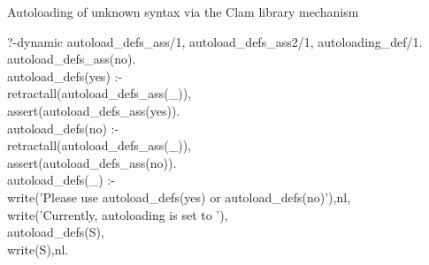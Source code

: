 \documentclass[11pt]{report}
\begin{document}
{ Autoloading of unknown syntax via the Clam library mechanism
\begin{sf}\begin{tabbing}
?-dynamic autoload\_\hspace{0.1em}defs\_\hspace{0.1em}ass/1, autoload\_\hspace{0.1em}defs\_\hspace{0.1em}ass2/1, autoloading\_\hspace{0.1em}def/1.\\[-0.15ex]
autoload\_\hspace{0.1em}defs\_\hspace{0.1em}ass(no).\\[-0.15ex]
autoload\_\hspace{0.1em}defs(yes) :-\\[-0.15ex]
\hspace{2em}retractall(autoload\_\hspace{0.1em}defs\_\hspace{0.1em}ass(\_\hspace{0.1em})),\\[-0.15ex]
\hspace{2em}assert(autoload\_\hspace{0.1em}defs\_\hspace{0.1em}ass(yes)).\\[-0.15ex]
autoload\_\hspace{0.1em}defs(no) :-\\[-0.15ex]
\hspace{2em}retractall(autoload\_\hspace{0.1em}defs\_\hspace{0.1em}ass(\_\hspace{0.1em})),\\[-0.15ex]
\hspace{2em}assert(autoload\_\hspace{0.1em}defs\_\hspace{0.1em}ass(no)).\\[-0.15ex]
autoload\_\hspace{0.1em}defs(\_\hspace{0.1em}) :-\\[-0.15ex]
\hspace{2em}write('Please use autoload\_\hspace{0.1em}defs(yes) or autoload\_\hspace{0.1em}defs(no)'),nl,\\[-0.15ex]
\hspace{2em}write('Currently, autoloading is set to '),\\[-0.15ex]
\hspace{2em}autoload\_\hspace{0.1em}defs(S),\\[-0.15ex]
\hspace{2em}write(S),nl.\\[-0.7ex]


\end{tabbing}
\end{sf}}
\end{document}
